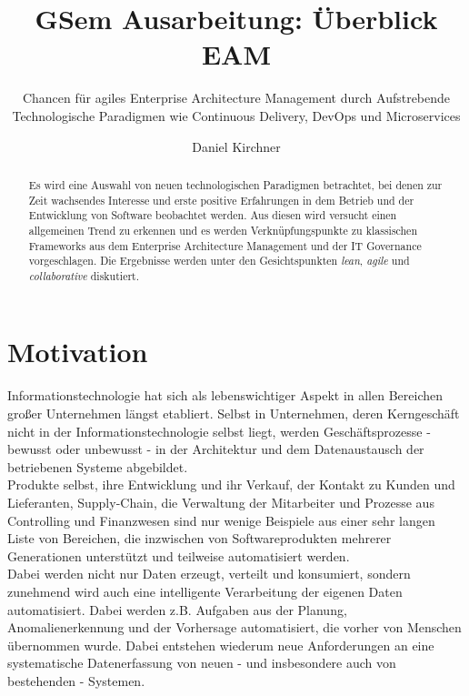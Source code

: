 \documentclass{llncs}
\begin{document}
\title{GSem Ausarbeitung: Überblick EAM}
\subtitle{Chancen für agiles Enterprise Architecture Management durch Aufstrebende Technologische Paradigmen wie Continuous Delivery, DevOps und Microservices}
\author{Daniel Kirchner}
\maketitle
%
\begin{abstract}
Es wird eine Auswahl von neuen technologischen Paradigmen betrachtet, bei denen zur Zeit wachsendes Interesse und erste positive Erfahrungen in dem Betrieb und der Entwicklung von Software beobachtet werden.
Aus diesen wird versucht einen allgemeinen Trend zu erkennen und es werden Verknüpfungspunkte zu klassischen Frameworks aus dem Enterprise Architecture Management und der IT Governance vorgeschlagen.
Die Ergebnisse werden unter den Gesichtspunkten \textit{lean}, \textit{agile} und \textit{collaborative} diskutiert.
\end{abstract}
%
\section{Motivation}
%
Informationstechnologie hat sich als lebenswichtiger Aspekt in allen Bereichen großer Unternehmen längst etabliert. Selbst in Unternehmen, deren Kerngeschäft nicht in der Informationstechnologie selbst liegt, werden Geschäftsprozesse - bewusst oder unbewusst - in der Architektur und dem Datenaustausch der betriebenen Systeme abgebildet.\\

Produkte selbst, ihre Entwicklung und ihr Verkauf, der Kontakt zu Kunden und Lieferanten, Supply-Chain, die Verwaltung der Mitarbeiter und Prozesse aus Controlling und Finanzwesen sind nur wenige Beispiele aus einer sehr langen Liste von Bereichen, die inzwischen von Softwareprodukten mehrerer Generationen unterstützt und teilweise automatisiert werden.\\

Dabei werden nicht nur Daten erzeugt, verteilt und konsumiert, sondern zunehmend wird auch eine intelligente Verarbeitung der eigenen Daten automatisiert. Dabei werden z.B. Aufgaben aus der Planung, Anomalienerkennung und der Vorhersage automatisiert, die vorher von Menschen übernommen wurde. Dabei entstehen wiederum neue Anforderungen an eine systematische Datenerfassung von neuen - und insbesondere auch von bestehenden - Systemen.\\
\end{document}
